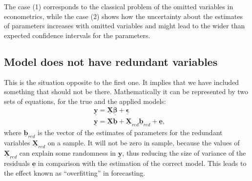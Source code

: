 \documentclass[
]{book}
\begin{document}
The case (1) corresponds to the classical problem of the omitted variables in econometrics, while the case (2) shows how the uncertainty about the estimates of parameters increases with omitted variables and might lead to the wider than expected confidence intervals for the parameters.

\hypertarget{assumptionsSpecificationRedundant}{%
\subsection{Model does not have redundant variables}\label{assumptionsSpecificationRedundant}}

This is the situation opposite to the first one. It implies that we have included something that should not be there. Mathematically it can be represented by two sets of equations, for the true and the applied models:
\begin{equation}
    \begin{aligned}
        & \underline{\mathbf{y}} = \underline{\mathbf{X}} \underline{\boldsymbol{\beta}} + \underline{\boldsymbol{\epsilon}} \\
        & \underline{\mathbf{y}} = \underline{\mathbf{X}} \underline{\boldsymbol{b}} + \underline{\mathbf{X}}_{red} \underline{\boldsymbol{b}}_{red} + \underline{\boldsymbol{e}} ,
    \end{aligned}
    \label{eq:AssumptionsRedundantSetting}
\end{equation}
where \(\underline{\boldsymbol{b}}_{red}\) is the vector of the estimates of parameters for the redundant variables \(\underline{\mathbf{X}}_{red}\) on a sample. It will not be zero in sample, because the values of \(\underline{\mathbf{X}}_{red}\) can explain some randomness in \(\underline{\mathbf{y}}\), thus reducing the size of variance of the residuals \(\underline{\boldsymbol{e}}\) in comparison with the estimation of the correct model. This leads to the effect known as ``overfitting'' in forecasting.
\end{document}
